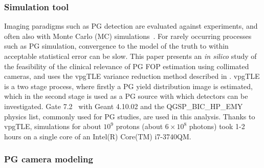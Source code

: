\documentclass[a4paper,english]{article}
\begin{document}
\subsubsection{Simulation tool}

Imaging paradigms such as PG detection are evaluated against experiments, and often also with Monte Carlo (MC) simulations~\citep{Moteabbed2011,Gueth2013,Robert2013,Golnik2014a,Janssen2014}. For rarely occurring processes such as PG simulation, convergence to the model of the truth to within acceptable statistical error can be slow. This paper presents an \emph{in silico} study of the feasibility of the clinical relevance of PG FOP estimation using collimated cameras, and uses the vpgTLE variance reduction method described in \cite{Huisman2016}. vpgTLE is a two stage process, where firstly a PG yield distribution image is estimated, which in the second stage is used as a PG source with which detectors can be investigated. Gate 7.2~\citep{Sarrut2014} with Geant 4.10.02 and the QGSP\_BIC\_HP\_EMY physics list, commonly used for PG studies, are used in this analysis. Thanks to vpgTLE, simulations for about $10^9$ protons (about $6\times10^8$ photons) took 1-2 hours on a single core of an Intel(R) Core(TM) i7-3740QM.

\subsubsection{PG camera modeling}\label{sec:camera}
\end{document}
